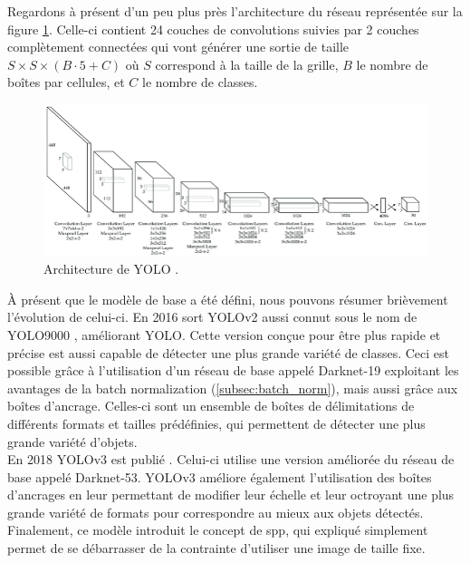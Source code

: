 Regardons à présent d'un peu plus près l'architecture du réseau représentée sur la figure \ref{fig:yolo_architecture}. Celle-ci contient 24 couches de convolutions suivies par 2 couches complètement connectées qui vont générer une sortie de taille $S \times S \times (B \cdot 5 + C)$ où $S$ correspond à la taille de la grille, $B$ le nombre de boîtes par cellules, et $C$ le nombre de classes.

\begin{figure}[hbt!]
    \centering
    \includegraphics[scale=0.5]{Figures/yolo_architecture.png}
    \caption{Architecture de YOLO \cite{noauthor_figure_nodate-3}.}
    \label{fig:yolo_architecture}
\end{figure}

À présent que le modèle de base a été défini, nous pouvons résumer brièvement l'évolution de celui-ci. En 2016 sort YOLOv2 aussi connut sous le nom de YOLO9000 \cite{redmon_yolo9000_2016}, améliorant YOLO. Cette version conçue pour être plus rapide et précise est aussi capable de détecter une plus grande variété de classes. Ceci est possible grâce à l'utilisation d'un réseau de base appelé Darknet-19 exploitant les avantages de la batch normalization (\ref{subsec:batch_norm}), mais aussi grâce aux boîtes d'ancrage. Celles-ci sont un ensemble de boîtes de délimitations de différents formats et tailles prédéfinies, qui permettent de détecter une plus grande variété d'objets.\\

En 2018 YOLOv3 est publié \cite{redmon_yolov3_2018}. Celui-ci utilise une version améliorée du réseau de base appelé Darknet-53. YOLOv3 améliore également l'utilisation des boîtes d'ancrages en leur permettant de modifier leur échelle et leur octroyant une plus grande variété de formats pour correspondre au mieux aux objets détectés. Finalement, ce modèle introduit le concept de \acrfull{spp}, qui expliqué simplement permet de se débarrasser de la contrainte d'utiliser une image de taille fixe.\\

